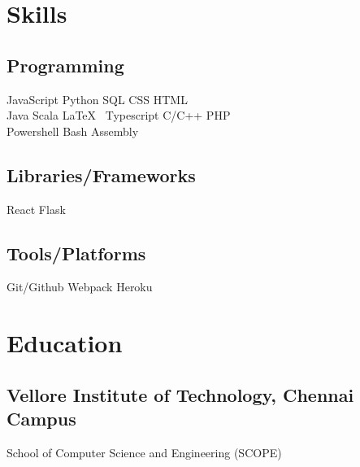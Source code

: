 \documentclass[]{plushcv}
\begin{document}
\hfill
\begin{minipage}[t]{0.25\textwidth}


    \section{Skills}
    \subsection{Programming}
    \sectionsep
    JavaScript \textbullet{} Python \textbullet{} SQL \textbullet{} CSS \textbullet{} HTML \textbullet{} \\
    \sectionsep
    Java \textbullet{} Scala \textbullet{} \LaTeX\ \textbullet{} Typescript \textbullet{} C/C++ \textbullet{} PHP \\
    \sectionsep
    Powershell \textbullet{} Bash \textbullet{} Assembly \\
    \sectionsep
    \sectionsep
    \subsection{Libraries/Frameworks}
    \sectionsep
    React \textbullet{} Flask \\
    \sectionsep
    \sectionsep
    \subsection{Tools/Platforms}
    \sectionsep
    Git/Github \textbullet{} Webpack \textbullet{} Heroku
    \sectionsep


    \section{Education}
    \subsection{Vellore Institute of Technology, Chennai Campus}
    School of Computer Science and Engineering (SCOPE) \\


\end{minipage}
\end{document}
